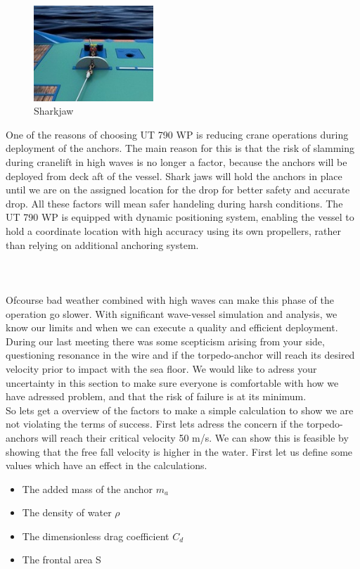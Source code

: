 \documentclass[a4paper,norsk]{article}
\begin{document}
\begin{figure}
  \vspace{-60pt}
  \begin{center}
    \includegraphics[width=0.4\textwidth]{sharkjaw.jpg}
  \end{center} 
  \vspace{-20pt}
  \caption{Sharkjaw}
  \vspace{-10pt}
\end{figure}

 One of the reasons of choosing UT 790 WP is reducing crane operations during deployment of the anchors. The main reason for this is that the risk of slamming during cranelift in high waves is no longer a factor, because the anchors will be deployed from deck aft of the vessel.   Shark jaws will hold the anchors in place until we are on the assigned location for the drop for better safety and accurate drop. All these factors will mean safer handeling during harsh conditions. The UT 790 WP is equipped with dynamic positioning system, enabling the vessel to hold a coordinate location with high accuracy using its own propellers, rather than relying on additional anchoring system.
\\ \\ \\ \\ 
Ofcourse bad weather combined with high waves can make this phase of the operation go slower. With significant wave-vessel simulation and analysis, we know our limits and when we can execute a quality and efficient deployment.  
\\
During our last meeting there was some scepticism arising from your side, questioning resonance in the wire and if the torpedo-anchor will reach its desired velocity prior to impact with the sea floor. We would like to adress your uncertainty in this section to make sure everyone is comfortable with how we have adressed problem, and that the risk of failure is at its minimum. 
\\
So lets get a overview of the factors to make a simple calculation to show we are not violating the terms of success. First lets adress the concern if the torpedo-anchors will reach their critical velocity 50 m/s. We can show this is feasible by showing that the free fall velocity is higher in the water. First let us define some values which have an effect in the calculations.
\begin{itemize}
\item The added mass of the anchor $m_a$ 
\item The density of water $\rho$
\item The dimensionless drag coefficient $C_d$
\item The frontal area S
\end{itemize}
\end{document}

